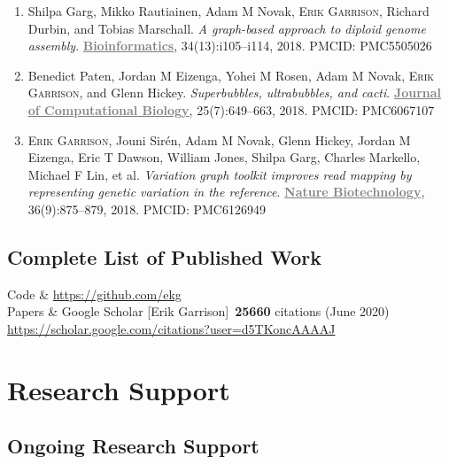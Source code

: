\documentclass{nihbiosketch}
\newcommand{\hijournal}[1]{{\bf \textcolor{gray}{\uline{#1}}}}
\begin{document}
\begin{enumerate}
\begin{enumerate}
  \item Shilpa Garg, Mikko Rautiainen, Adam M Novak, \textsc{Erik Garrison}, Richard Durbin, and Tobias Marschall. \emph{A graph-based approach to diploid genome assembly}. \hijournal{Bioinformatics}, 34(13):i105–i114, 2018. PMCID: PMC5505026

  \item Benedict Paten, Jordan M Eizenga, Yohei M Rosen, Adam M Novak, \textsc{Erik Garrison}, and Glenn Hickey. \emph{Superbubbles, ultrabubbles, and cacti}. \hijournal{Journal of Computational Biology}, 25(7):649–663, 2018. PMCID: PMC6067107

  \item \textsc{Erik Garrison}, Jouni Sirén, Adam M Novak, Glenn Hickey, Jordan M Eizenga, Eric T Dawson, William Jones, Shilpa Garg, Charles Markello, Michael F Lin, et al. \emph{Variation graph toolkit improves read mapping by representing genetic variation in the reference}. \hijournal{Nature Biotechnology}, 36(9):875–879, 2018. PMCID: PMC6126949

  \end{enumerate}

\end{enumerate}

\subsection*{Complete List of Published Work}

\begin{datetbl}
  Code & \url{https://github.com/ekg} \\
  Papers & Google Scholar [Erik Garrison]~{\bf 25660} citations (June 2020) \url{https://scholar.google.com/citations?user=d5TKoncAAAAJ}
\end{datetbl}



\section{Research Support}

\subsection*{Ongoing Research Support}
\end{document}
